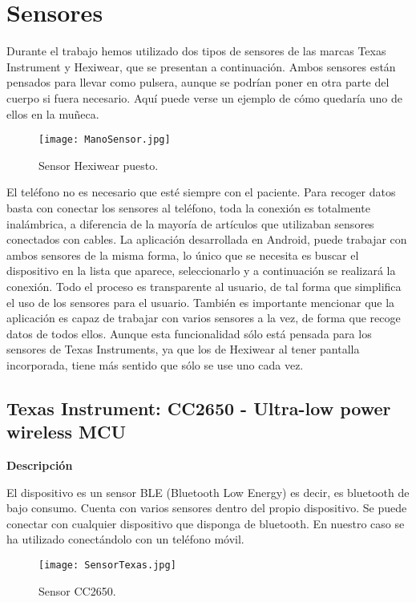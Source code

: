 \documentclass[11pt,spanish]{article}
\begin{document}
\section{Sensores}
Durante el trabajo hemos utilizado dos tipos de sensores de las marcas Texas Instrument y Hexiwear, que se presentan a continuación. Ambos sensores están pensados para llevar como pulsera, aunque se podrían poner en otra parte del cuerpo si fuera necesario. Aquí puede verse un ejemplo de cómo quedaría uno de ellos en la muñeca.
\begin{figure}[h!]
  \centering
  \texttt{[image: ManoSensor.jpg]}
  \caption{Sensor Hexiwear puesto.}
\end{figure}

El teléfono no es necesario que esté siempre con el paciente. Para recoger datos basta con conectar los sensores al teléfono, toda la conexión es totalmente inalámbrica, a diferencia de la mayoría de artículos que utilizaban sensores conectados con cables. La aplicación desarrollada en Android, puede trabajar con ambos sensores de la misma forma, lo único que se necesita es buscar el dispositivo en la lista que aparece, seleccionarlo y a continuación se realizará la conexión. Todo el proceso es transparente al usuario, de tal forma que simplifica el uso de los sensores para el usuario. También es importante mencionar que la aplicación es capaz de trabajar con varios sensores a la vez, de forma que recoge datos de todos ellos. Aunque esta funcionalidad sólo está pensada para los sensores de Texas Instruments, ya que los de Hexiwear al tener pantalla incorporada, tiene más sentido que sólo se use uno cada vez.
\newline

\subsection{Texas Instrument: CC2650 - Ultra-low power wireless MCU}
{\bf Descripción}
\newline

El dispositivo es un sensor BLE (Bluetooth Low Energy) es decir, es bluetooth de bajo consumo. Cuenta con varios sensores dentro del propio dispositivo. Se puede conectar con cualquier dispositivo que disponga de bluetooth. En nuestro caso se ha utilizado conectándolo con un teléfono móvil. 
\newline

\begin{figure}[h!]
  \centering
  \texttt{[image: SensorTexas.jpg]}
  \caption{Sensor CC2650.}
\end{figure}
\end{document}
